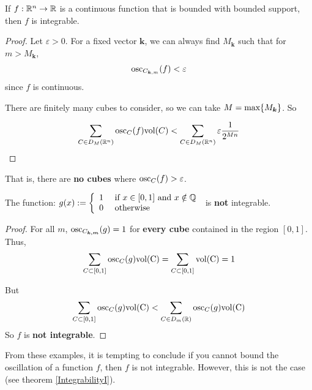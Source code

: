 \begin{example}
    \begin{theorem}
        If $f: \mathbb{R}^n \to \mathbb{R}$ is a continuous function that is bounded with bounded support, then $f$ is integrable.
    \end{theorem}

\begin{proof}
    Let $\varepsilon > 0$.  For a fixed vector $\bm{k}$, we can always find $M_{\bm{k}}$ such that for $m > M_{\bm{k}}$, 
    $$\textnormal{osc}_{C_{\bm{k},m}}(f) < \varepsilon$$
    since $f$ is continuous.

    There are finitely many cubes to consider, so we can take $M = \textnormal{max}\{M_{\bm{k}}\}$. So

    $$\sum_{C \in D_M(\mathbb{R}^n)} \textnormal{osc}_C(f) \textnormal{vol}(C) < \sum_{C \in D_M(\mathbb{R}^n)} \varepsilon \frac{1}{2^{Mn}}$$
\end{proof}

    That is, there are \textbf{no cubes} where $\textnormal{osc}_C(f) > \varepsilon$.
\end{example}

\begin{example}

    \begin{proposition}
        The function: $g(x) := \left\{
		\begin{array}{ll}
			1 & \text{ if } x \in [0,1] \text{ and }  x \notin \mathbb{Q} \\
			0 & \text{ otherwise}
		\end{array}
		\right.$ is \textbf{not} integrable.
    \end{proposition}

    \begin{proof}
    For all $m$, $\textnormal{osc}_{C_{\bm{k,m}}}(g) = 1$ for \textbf{every cube} contained in the region $[0,1]$.  Thus, $$\sum_{C \subset [0,1]} \textnormal{osc}_C(g) \textnormal{vol(C)} = \sum_{C \subset [0,1]} \textnormal{vol(C)} = 1$$
    
    But $$\sum_{C \subset [0,1]} \textnormal{osc}_C(g) \textnormal{vol(C)} < \sum_{C \in D_m(\mathbb{R})} \textnormal{osc}_C(g) \textnormal{vol(C)}$$
    So $f$ is \textbf{not integrable}.        
    \end{proof}

\end{example}

From these examples, it is tempting to conclude if you cannot bound the oscillation of a function $f$, then $f$ is not integrable. However, this is not the case (see theorem \ref{IntegrabilityI}).

